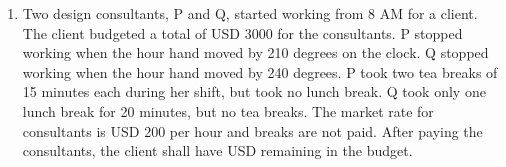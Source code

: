 \documentclass[a4paper, 11pt]{article}
\begin{document}
\begin{enumerate}
    \item Two design consultants, P and Q, started working from 8 AM for a client. The client budgeted a total of USD 3000 for the consultants. P stopped working when the hour hand moved by 210 degrees on the clock. Q stopped working when the hour hand moved by 240 degrees. P took two tea breaks of 15 minutes each during her shift, but took no lunch break. Q took only one lunch break for 20 minutes, but no tea breaks. The market rate for consultants is USD 200 per hour and breaks are not paid. After paying the consultants, the client shall have USD \underline{\hspace{2cm}} remaining in the budget.
    \begin{enumerate}
    \end{enumerate}
    \hfill{}


\end{enumerate}
\end{document}
